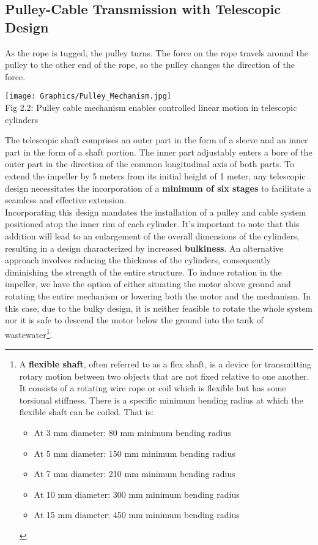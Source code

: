 \documentclass[a4,10pt]{report}
\begin{document}
\subsection{Pulley-Cable Transmission with Telescopic Design}
As the rope is tugged, the pulley turns. The force on the rope travels around the pulley to the other end of the rope, so the pulley changes the direction of the force.\cite{pulley_cable} \\     
\begin{center}
    \texttt{[image: Graphics/Pulley\_Mechanism.jpg]} \\
    \normalsize{Fig 2.2: Pulley cable mechanism enables controlled linear motion in telescopic cylinders}
\end{center}
The telescopic shaft comprises an outer part in the form of a sleeve and an inner part in the form of a shaft portion. The inner part adjustably enters a bore of the outer part in the direction of the common longitudinal axis of both parts. To extend the impeller by 5 meters from its initial height of 1 meter, any telescopic design necessitates the incorporation of a \textbf{minimum of six stages} to facilitate a seamless and effective extension. 
\vspace{2mm} \\
Incorporating this design mandates the installation of a pulley and cable system positioned atop the inner rim of each cylinder. It's important to note that this addition will lead to an enlargement of the overall dimensions of the cylinders, resulting in a design characterized by increased \textbf{bulkiness}. An alternative approach involves reducing the thickness of the cylinders, consequently diminishing the strength of the entire structure. To induce rotation in the impeller, we have the option of either situating the motor above ground and rotating the entire mechanism or lowering both the motor and the mechanism. In this case, due to the bulky design, it is neither feasible to rotate the whole system nor it is safe to descend the motor below the ground into the tank of wastewater\footnote{A \textbf{flexible shaft}, often referred to as a flex shaft, is a device for transmitting rotary motion between two objects that are not fixed relative to one another. It consists of a rotating wire rope or coil which is flexible but has some torsional stiffness. There is a specific minimum bending radius at which the flexible shaft can be coiled.\cite{min_bend} That is:
\begin{itemize}
    \item At 3 mm diameter: 80 mm minimum bending radius
    \item At 5 mm diameter: 150 mm minimum bending radius
    \item At 7 mm diameter: 210 mm minimum bending radius
    \item At 10 mm diameter: 300 mm minimum bending radius
    \item At 15 mm diameter: 450 mm minimum bending radius
\end{itemize}}.
\vspace{2mm} \\
\end{document}
